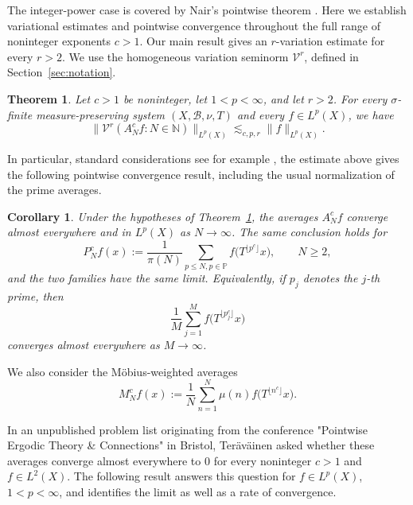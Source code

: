 \documentclass[10pt,leqno]{amsart}
\newcounter{counter}
\newcounter{counter2}
\numberwithin{equation}{section}
\numberwithin{counter2}{section}
\newtheorem{theorem}[counter]{Theorem}
\newtheorem{corollary}[counter]{Corollary}
\theoremstyle{definition}
\theoremstyle{plain}
\begin{document}
	The integer-power case is covered by Nair's pointwise theorem \cite{Nair1993}.
	Here we establish variational estimates and pointwise convergence throughout
	the full range of noninteger exponents $c>1$. Our main result gives an
	$r$-variation estimate for every $r>2$. We use the homogeneous
	variation seminorm $\mathcal V^r$, defined in
	Section~\ref{sec:notation}.
	
	\begin{theorem}\label{t:maintheorem}
		Let $c>1$ be noninteger, let $1<p<\infty$, and let $r>2$.
		For every $\sigma$-finite measure-preserving system
		$(X,\mathcal B,\nu,T)$ and every $f\in L^p(X)$, we have
		\begin{equation}\label{eq:main-variation}
			\bigl\|\mathcal V^r(A_N^{c} f:N\in\mathbb N)\bigr\|_{L^p(X)}
			\lesssim_{c,p,r}\|f\|_{L^p(X)}.
		\end{equation}
		
	\end{theorem}
	
	 In	particular, standard considerations see for example \cite[Lemma 1]{FHK2007},  the estimate above gives the following pointwise convergence result,
	including the usual normalization of the prime averages.
	
	\begin{corollary}\label{cor:prime-convergence}
		Under the hypotheses of Theorem~\ref{t:maintheorem}, the averages
		$A_N^{c} f$ converge almost everywhere and in $L^p(X)$ as $N\to\infty$.
		The same conclusion holds for
		\[
		P_N^{c} f(x):=\frac1{\pi(N)}
		\sum_{p\le N,p \in \mathbb{P}}
		f\bigl(T^{\lfloor p^c\rfloor}x\bigr),\qquad N\ge2,
		\]
		and the two families have the same limit.
		Equivalently, if $p_j$ denotes the $j$-th prime, then
		\[
		\frac1M\sum_{j=1}^M f\bigl(T^{\lfloor p_j^c\rfloor}x\bigr)
		\]
		converges almost everywhere as $M\to\infty$.
	\end{corollary}

	
	We also consider the M\"obius-weighted averages
	\[
	M_N^{c} f(x):=\frac1N\sum_{n=1}^N
	\mu(n)f\bigl(T^{\lfloor n^c\rfloor}x\bigr).
	\]
	
    In an unpublished problem list originating from the conference "Pointwise Ergodic Theory \& Connections" in Bristol, Ter\"av\"ainen asked whether these
	averages converge almost everywhere to $0$ for every noninteger $c>1$ and $f \in L^2(X)$.
	The following result answers this question for $f\in L^p(X)$,
	$1<p<\infty$, and identifies the limit as well as a rate of convergence.
    
\end{document}
